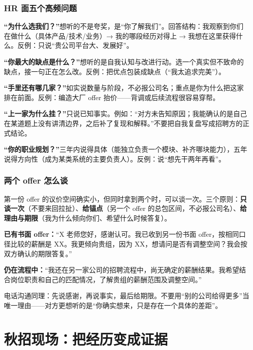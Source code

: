 \documentclass[UTF8,zihao=5,openany]{ctexbook}
\begin{document}
\subsection{HR 面五个高频问题}

\textbf{“为什么选我们？”}想听的不是夸奖，是“你了解我们”。回答结构：我观察到你们在做什么（具体产品/技术/业务）→ 我的哪段经历对得上 → 我想在这里获得什么。反例：只说“贵公司平台大、发展好”。

\textbf{“你最大的缺点是什么？”}想听的是自我认知与改进行动。选一个真实但不致命的缺点，接一句正在怎么改。反例：把优点包装成缺点（“我太追求完美”）。

\textbf{“手里还有哪几家？”}如实说数量与阶段，不必报公司名；重点是你为什么把这家排在前面。反例：编造大厂 offer 抬价——背调或后续流程很容易穿帮。

\textbf{“上一家为什么挂？”}只说已知事实。例如：“对方未告知原因；我能确认的是自己在某道题上没有讲清边界，之后补了复现和解释。”不要把自我复盘写成招聘方的正式结论。

\textbf{“你的职业规划？”}三年内说得具体（能独立负责一个模块、补齐哪块能力），五年说得方向性（成为某类系统的主要负责人）。反例：说“想先干两年再看”。

\subsection{两个 offer 怎么谈}

第一份 offer 的议价空间确实小，但同时拿到两个时，可以谈一次。三个原则：\textbf{只谈一次}（不要来回拉扯）、\textbf{给锚点}（另一个 offer 的总包区间，不必报公司名）、\textbf{给理由与期限}（我为什么倾向你们、希望什么时候答复）。

\begin{casebox}
\textbf{已有书面 offer：}“X 老师您好，感谢认可。我已收到另一份书面 offer，按相同口径比较的薪酬是 XX。我更倾向贵组，因为 XX，想请问是否有调整空间？我会按双方确认的期限答复。”

\textbf{仍在流程中：}“我还在另一家公司的招聘流程中，尚无确定的薪酬结果。我希望结合岗位职责和自己的匹配情况，了解贵组的薪酬范围及调整空间。”
\end{casebox}

电话沟通同理：先说感谢，再说事实，最后给期限。不要用“别的公司给得更多”当唯一理由——对方更想听的是“你确实想来，只是存在一个具体的差距”。


\chapter{秋招现场：把经历变成证据}
\end{document}
